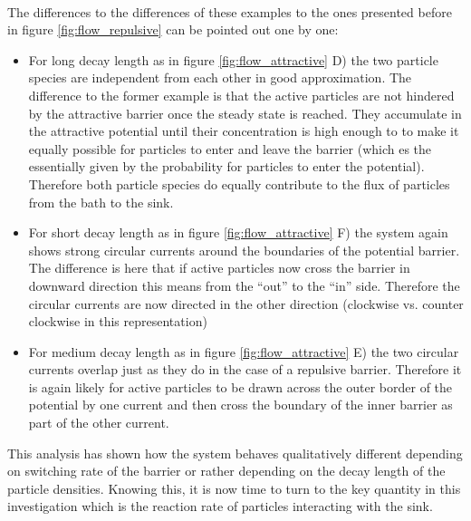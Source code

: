 \vspace{.5 cm} \\
The differences to the differences of these examples to the ones presented before in figure \ref{fig:flow_repulsive} can be pointed out one by one:
\begin{itemize}
    \item For long decay length as in figure \ref{fig:flow_attractive} D) the two particle species are independent from each other in good approximation. The difference to the former example is that the active particles are not hindered by the attractive barrier once the steady state is reached. They accumulate in the attractive potential until their concentration is high enough to to make it equally possible for particles to enter and leave the barrier (which es the essentially given by the probability for particles to enter the potential). Therefore both particle species do equally contribute to the flux of particles from the bath to the sink.
    \item For short decay length as in figure \ref{fig:flow_attractive} F) the system again shows strong circular currents around the boundaries of the potential barrier. The difference is here that if active particles now cross the barrier in downward direction this means from the ``out'' to the ``in'' side. Therefore the circular currents are now directed in the other direction (clockwise vs. counter clockwise in this representation)
    \item For medium decay length as in figure \ref{fig:flow_attractive} E)  the two circular currents overlap just as they do in the case of a repulsive barrier. Therefore it is again likely for active particles to be drawn across the outer border of the potential by one current and then cross the boundary of the inner barrier as part of the other current.
\end{itemize}
This analysis has shown how the system behaves qualitatively different depending on switching rate of the barrier or rather depending on the decay length of the particle densities. Knowing this, it is now time to turn to the key quantity in this investigation which is the reaction rate of particles interacting with the sink. 
